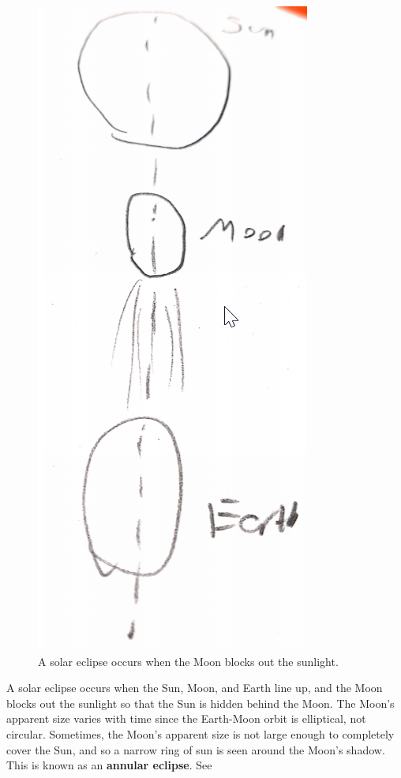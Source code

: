 \documentclass{templates/homework}
\begin{document}
\begin{figure}[t]
    \includegraphics[]{diagrams/figure3.png}
    \caption{A solar eclipse occurs when the Moon blocks
    out the sunlight.}
    \label{fig:3}
\end{figure}
A solar eclipse occurs when the Sun, Moon, and Earth line up, and the Moon
blocks out the sunlight so that the Sun is hidden behind the Moon. The Moon's apparent size
varies with time since the Earth-Moon orbit is elliptical, not circular. Sometimes,
the Moon's apparent size is not large enough to completely cover the Sun, and so a
narrow ring of sun is seen around the Moon's shadow. This is known as an
\textbf{annular eclipse}. See 
\end{document}
